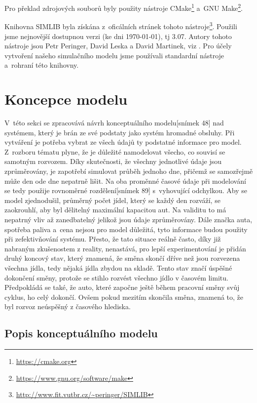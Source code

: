 \documentclass[a4paper, 11pt]{article}
\begin{document}
	Pro překlad zdrojových souborů byly použity nástroje
	CMake\footnote{\url{https://cmake.org}}
	a~GNU Make\footnote{\url{https://www.gnu.org/software/make}}.

	Knihovna SIMLIB byla získána z~oficálních stránek tohoto
	nástroje\footnote{\url{http://www.fit.vutbr.cz/~peringer/SIMLIB}}.
	Použili jsme nejnovější dostupnou verzi (ke dni \today), tj 3.07.
	Autory tohoto nástroje jsou Petr Peringer, David Leska a David Martinek,
	viz \cite{SIMLIB}. Pro účely vytvoření našeho simulačního modelu jsme
	používali standardní nástroje a~rohraní této knihovny.



	\section{Koncepce modelu}

	V~této sekci se zpracovává návrh konceptuálního modelu[snímek 48]\cite{IMS_slides} nad
	systémem, který je brán ze své podstaty jako systém hromadné obsluhy. Při vytváření
	je potřeba vybrat ze všech údajů ty podstatné informace pro model. Z~rozboru tématu 
	plyne, že je důležité namodelovat všecho, co souvisí se samotným rozvozem. Díky 
	skutečnosti, že všechny jednotlivé údaje jsou zprůměrovány, je zapotřebí simulovat průběh
	jednoho dne, přičemž se samozřejmě může den ode dne nepatrně lišit.	Na oba proměnné 
	časové údaje při modelování se tedy použije rovnoměrné rozdělení[snímek 89]\cite{IMS_slides}
	s~vyhovující odchylkou. Aby se model zjednodušil, průměrný počet jídel, který se 
	každý den rozváží, se zaokrouhlí, aby byl dělitelný maximální kapacitou aut. Na 
	validitu to má nepatrný	vliv až zanedbatelný jelikož jsou údaje zprůměrovány. Dále 
	značka auta, spotřeba paliva a~cena nejsou pro model důležitá, tyto informace budou 
	použity při	zefektivňování systému. Přesto, že tato situace reálně často, díky již 
	nabraným zkušenostem z reality, nenastává, pro lepší experimentování je přidán druhý 
	koncový stav, který znamená, že směna skončí dříve než jsou rozvezena všechna jídla, 
	tedy nějaká	jídla zbydou na skladě. Tento stav značí úspěšné dokončení směny, protože 
	se stihlo rozvést všechno jídlo v časovém limitu. Předpokládá se také, že auto, které 
	započne ještě během pracovní směny svůj cyklus, ho celý dokončí. Ovšem pokud mezitím 
	skončila směna, znamená to, že byl rozvoz neúspěšný z časového hlediska.


	\subsection{Popis konceptuálního modelu}
\end{document}
